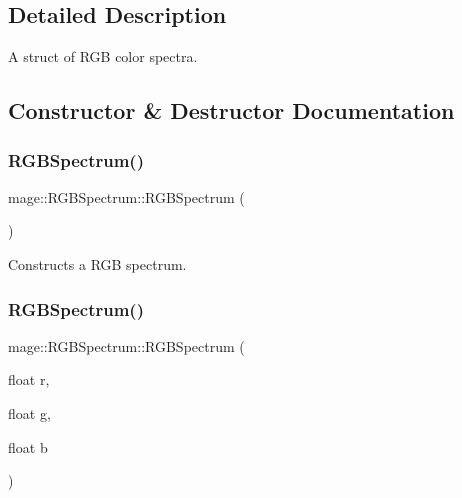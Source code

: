 \subsection{Detailed Description}
A struct of R\+GB color spectra. 

\subsection{Constructor \& Destructor Documentation}
\hypertarget{structmage_1_1_r_g_b_spectrum_ac9ebcf270e9572fd0af180f50b7ceb10}{}\label{structmage_1_1_r_g_b_spectrum_ac9ebcf270e9572fd0af180f50b7ceb10} 
\subsubsection{\texorpdfstring{R\+G\+B\+Spectrum()}{RGBSpectrum()}\hspace{0.1cm}{\footnotesize\ttfamily [1/8]}}
{\footnotesize\ttfamily mage\+::\+R\+G\+B\+Spectrum\+::\+R\+G\+B\+Spectrum (\begin{DoxyParamCaption}{ }\end{DoxyParamCaption})}

Constructs a R\+GB spectrum. \hypertarget{structmage_1_1_r_g_b_spectrum_aae798159a0ea02e95347918ef881b3aa}{}\label{structmage_1_1_r_g_b_spectrum_aae798159a0ea02e95347918ef881b3aa} 
\subsubsection{\texorpdfstring{R\+G\+B\+Spectrum()}{RGBSpectrum()}\hspace{0.1cm}{\footnotesize\ttfamily [2/8]}}
{\footnotesize\ttfamily mage\+::\+R\+G\+B\+Spectrum\+::\+R\+G\+B\+Spectrum (\begin{DoxyParamCaption}\item[{float}]{r,  }\item[{float}]{g,  }\item[{float}]{b }\end{DoxyParamCaption})\hspace{0.3cm}{\ttfamily [explicit]}}

